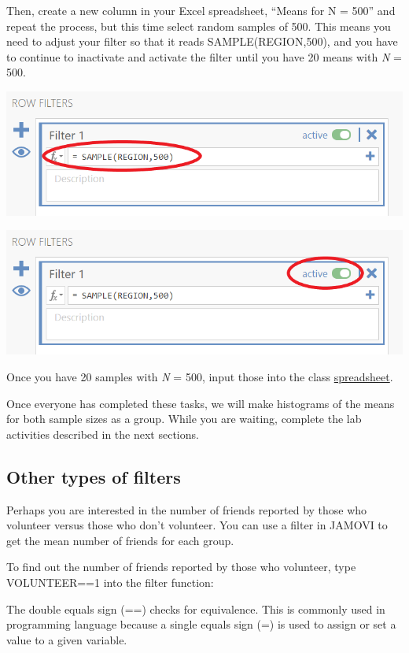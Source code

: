 \documentclass[
]{book}
\begin{document}
Then, create a new column in your Excel spreadsheet, ``Means for N = 500'' and repeat the process, but this time select random samples of 500. This means you need to adjust your filter so that it reads SAMPLE(REGION,500), and you have to continue to inactivate and activate the filter until you have 20 means with \emph{N} = 500.

\includegraphics{img/NewSamplingN500.png}

\includegraphics{img/RepeatingTheFilter2.png}

Once you have 20 samples with \emph{N} = 500, input those into the class \href{https://moodle.stfx.ca/course/view.php?id=26030\#section-10}{spreadsheet}.

Once everyone has completed these tasks, we will make histograms of the means for both sample sizes as a group. While you are waiting, complete the lab activities described in the next sections.

\hypertarget{other-types-of-filters}{%
\subsection{Other types of filters}\label{other-types-of-filters}}

Perhaps you are interested in the number of friends reported by those who volunteer versus those who don't volunteer. You can use a filter in JAMOVI to get the mean number of friends for each group.

To find out the number of friends reported by those who volunteer, type VOLUNTEER==1 into the filter function:

The double equals sign (==) checks for equivalence. This is commonly used in programming language because a single equals sign (=) is used to assign or set a value to a given variable.
\end{document}
